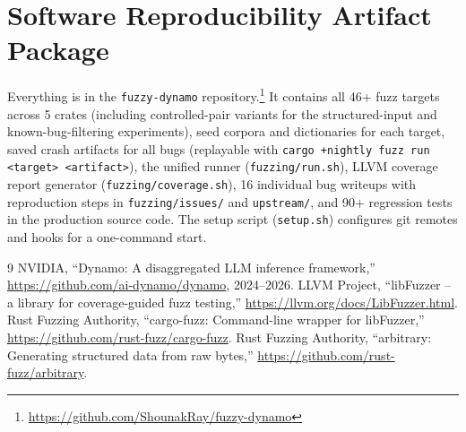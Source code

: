 \documentclass[11pt]{article}
\begin{document}
\section{Software Reproducibility Artifact Package}

Everything is in the \texttt{fuzzy-dynamo} repository.\footnote{\url{https://github.com/ShounakRay/fuzzy-dynamo}} It contains all 46+ fuzz targets across 5 crates (including controlled-pair variants for the structured-input and known-bug-filtering experiments), seed corpora and dictionaries for each target, saved crash artifacts for all bugs (replayable with \texttt{cargo +nightly fuzz run <target> <artifact>}), the unified runner (\texttt{fuzzing/run.sh}), LLVM coverage report generator (\texttt{fuzzing/coverage.sh}), 16 individual bug writeups with reproduction steps in \texttt{fuzzing/issues/} and \texttt{upstream/}, and 90+ regression tests in the production source code. The setup script (\texttt{setup.sh}) configures git remotes and hooks for a one-command start.

\begin{thebibliography}{9}
 NVIDIA, ``Dynamo: A disaggregated LLM inference framework,'' \url{https://github.com/ai-dynamo/dynamo}, 2024--2026.
 LLVM Project, ``libFuzzer -- a library for coverage-guided fuzz testing,'' \url{https://llvm.org/docs/LibFuzzer.html}.
 Rust Fuzzing Authority, ``cargo-fuzz: Command-line wrapper for libFuzzer,'' \url{https://github.com/rust-fuzz/cargo-fuzz}.
 Rust Fuzzing Authority, ``arbitrary: Generating structured data from raw bytes,'' \url{https://github.com/rust-fuzz/arbitrary}.
\end{thebibliography}
\end{document}
